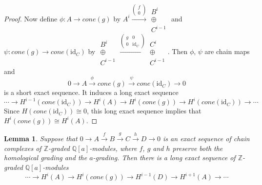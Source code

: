 \documentclass{amsart}
\theoremstyle{plain}
\newtheorem{lemma}[theorem]{Lemma}
\theoremstyle{definition}
\theoremstyle{remark}
\numberwithin{equation}{section}
\begin{document}
\begin{proof}
Now define $\phi:A\rightarrow cone(g)$ by 
$A^i \xrightarrow{\left(\begin{array}{c}
  f \\
  0
\end{array}\right)}
\left.\begin{array}{c}
  B^{i} \\
  \oplus \\
  C^{i-1}
\end{array}\right.$
and $\psi: cone(g) \rightarrow cone({\mathrm{id}}_C)$ by 
$\left.\begin{array}{c}
  B^i \\
  \oplus \\
  C^{i-1}
\end{array}\right.
\xrightarrow{\left(\begin{array}{cc}
  g & 0 \\
  0 & {\mathrm{id}}_C
\end{array}\right)}
\left.\begin{array}{c}
  C^{i} \\
  \oplus \\
  C^{i-1}
\end{array}\right.$.
Then $\phi$, $\psi$ are chain maps and
\[
0 \rightarrow A \xrightarrow{\phi} cone(g) \xrightarrow{\psi} cone({\mathrm{id}}_C) \rightarrow 0
\]
is a short exact sequence. It induces a long exact sequence 
\[
\cdots \rightarrow H^{i-1}(cone({\mathrm{id}}_C)) \rightarrow H^i(A) \rightarrow H^i(cone(g)) \rightarrow H^{i}(cone({\mathrm{id}}_C)) \rightarrow \cdots
\]
Since $H(cone({\mathrm{id}}_C)) \cong 0$, this long exact sequence implies that $H^i(cone(g)) \cong H^i(A)$.
\end{proof}

\begin{lemma}\label{lemma-cone-2}
Suppose that $0 \rightarrow A \xrightarrow{f} B \xrightarrow{g} C \xrightarrow{h} D \rightarrow 0$ is an exact sequence of chain complexes of ${\mathbb{Z}}$-graded ${\mathbb{Q}}[a]$-modules, where $f$, $g$ and $h$ preserve both the homological grading and the $a$-grading. Then there is a long exact sequence of ${\mathbb{Z}}$-graded ${\mathbb{Q}}[a]$-modules
	\[
	\cdots \rightarrow H^i(A) \rightarrow H^i(cone(g)) \rightarrow H^{i-1}(D) \rightarrow H^{i+1}(A) \rightarrow \cdots
	\]
\end{lemma}
\end{document}
